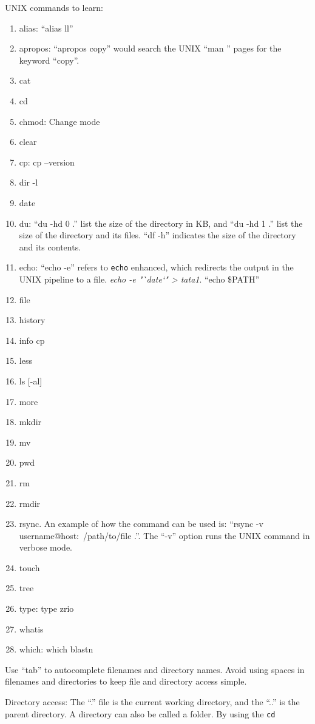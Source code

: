 UNIX commands to learn: \vspace{-0.3cm}
\begin{enumerate}	\itemsep -4pt
	\item alias: ``alias ll''
	\item apropos: ``apropos copy'' would search the UNIX ``man '' pages for the keyword ``copy''.
	\item cat
	\item cd
	\item chmod: Change mode
	\item clear
	\item cp: cp --version
	\item dir -l
	\item date
	\item du: ``du -hd 0 .'' list the size of the directory in KB, and ``du -hd 1 .'' list the size of the directory and its files. ``df -h'' indicates the size of the directory and its contents. 
	\item echo: ``echo -e'' refers to {\tt echo} enhanced, which redirects the output in the UNIX pipeline to a file. {\it echo -e "`date`" > tata1}. ``echo \$PATH''
	\item file
	\item history
	\item info cp
	\item less
	\item ls [-al]
	\item more
	\item mkdir
	\item mv
	\item pwd
	\item rm
	\item rmdir
	\item rsync. An example of how the command can be used is: ``rsync -v username@host:~/path/to/file .''. The ``-v'' option runs the UNIX command in verbose mode.
	\item touch
	\item tree
	\item type: type zrio
	\item whatis
	\item which: which blastn
\end{enumerate}


Use ``tab'' to autocomplete filenames and directory names. Avoid using spaces in filenames and directories to keep file and directory access simple.

Directory access: The ``.'' file is the current working directory, and the ``..'' is the parent directory. A directory can also be called a folder. By using the {\tt cd}

